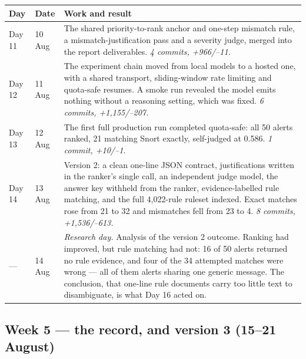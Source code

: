 \documentclass[11pt,a4paper]{article}
\begin{document}
{\small
\begin{tabularx}{\textwidth}{@{}p{15mm} p{11mm} L@{}}
\toprule
\textbf{Day} & \textbf{Date} & \textbf{Work and result} \\
\midrule
\endhead
Day 11 & 10 Aug & The shared priority-to-rank anchor and one-step mismatch rule, a
  mismatch-justification pass and a severity judge, merged into the report
  deliverables. \emph{4 commits, +966/--11.} \\
Day 12 & 11 Aug & The experiment chain moved from local models to a hosted one, with a
  shared transport, sliding-window rate limiting and quota-safe resumes. A smoke run
  revealed the model emits nothing without a reasoning setting, which was fixed.
  \emph{6 commits, +1{,}155/--207.} \\
Day 13 & 12 Aug & The first full production run completed quota-safe: all 50 alerts
  ranked, 21 matching Snort exactly, self-judged at 0.586.
  \emph{1 commit, +10/--1.} \\
Day 14 & 13 Aug & Version 2: a clean one-line JSON contract, justifications written in
  the ranker's single call, an independent judge model, the answer key withheld from
  the ranker, evidence-labelled rule matching, and the full 4{,}022-rule ruleset
  indexed. Exact matches rose from 21 to 32 and mismatches fell from 23 to 4.
  \emph{8 commits, +1{,}536/--613.} \\
--- & 14 Aug & \emph{Research day.} Analysis of the version 2 outcome. Ranking had
  improved, but rule matching had not: 16 of 50 alerts returned no rule evidence, and
  four of the 34 attempted matches were wrong --- all of them alerts sharing one
  generic message. The conclusion, that one-line rule documents carry too little text
  to disambiguate, is what Day 16 acted on. \\
\bottomrule
\end{tabularx}
}

\subsection{Week 5 --- the record, and version 3 (15--21 August)}
\end{document}
